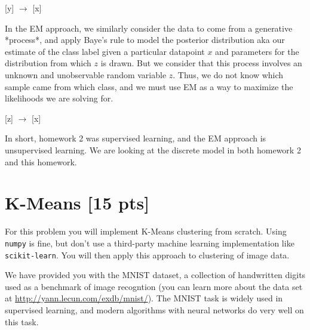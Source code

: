 \documentclass[submit]{harvardml}
\newenvironment{answer}{%
\color{answergreen}\sffamily\large}{}
\newcommand{\bx}{\mathbf{x}} %
\newcommand{\bz}{\mathbf{z}} %
\begin{document}
\begin{enumerate}
\begin{answer}
            [y] $\to$ [x] 

            In the EM approach, we similarly consider the data to come from a generative *process*,
            and apply Baye's rule to model the posterior distribution aka our estimate of the class
            label given a particular datapoint $x$ and parameters for the distribution from which $z$
            is drawn. But we consider that this process involves an unknown and unobservable random
            variable $z$. Thus, we do not know which sample came from which class, and we must use
            EM as a way to maximize the likelihoods we are solving for.

            [z] $\to$ [x]


            In short, homework 2 was supervised learning, and the EM approach is unsupervised
            learning. We are looking at the discrete model in both homework 2 and this homework.



		\end{answer}

\end{enumerate}


\newpage

\section*{K-Means [15 pts]} %

For this problem you will implement  K-Means clustering from scratch. Using \texttt{numpy} is fine,
but don't use a third-party machine learning implementation like \texttt{scikit-learn}. You will
then apply this approach to clustering of image data.  



We have provided you with the MNIST dataset, a collection of handwritten digits used as a benchmark
of image recogntion (you  can learn more about the data set at
\url{http://yann.lecun.com/exdb/mnist/}). The MNIST task is widely used in supervised learning, and
modern algorithms with neural networks do very well on this task. 
\end{document}
